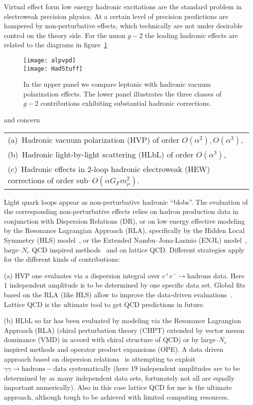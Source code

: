 \documentclass[epj,onecolumn]{webofc}
\newcommand{\mbo}[1]{$#1$ }
\newcommand{\epem}{e^+e^- }
\begin{document}
Virtual effect form low energy hadronic excitations are the standard
problem in electroweak precision physics. At a certain level of
precision predictions are hampered by non-perturbative effects, which
technically are not under desirable control on the theory side. For
the muon $g-2$ the leading hadronic effects are related to the
diagrams in figure~\ref{fig:hadstuff}
\begin{figure}
\centering
\texttt{[image: alpvpd]}\\[-1cm]
\texttt{[image: HadStuff]}
\caption{In the upper panel we compare leptonic with hadronic vacuum
polarization effects. The lower panel illustrates the three classes of
$g-2$ contributions exhibiting substantial hadronic corrections.}
\label{fig:hadstuff}
\end{figure}
and concern
\begin{tabular}{l}
(a)~Hadronic vacuum polarization (HVP) of order $O(\alpha^2),O(\alpha^3)$, \\
(b)~Hadronic light-by-light scattering (HLbL) of order $O(\alpha^3)$, \\
(c)~Hadronic effects in 2-loop hadronic electroweak (HEW) corrections
of order sub--$O(\alpha G_F m_\mu^2)$.
\end{tabular}

\noindent
Light quark loops appear as non-perturbative hadronic ``blobs''. The
evaluation of the corresponding non-perturbative effects relies on
hadron production data in conjunction with Dispersion Relations (DR),
or on low energy effective modeling by the Resonance Lagrangian
Approach (RLA), specifically by the Hidden Local Symmetry (HLS) model~\cite{HKS95},
or the Extended Nambu--Jona-Lasinio (ENJL) model~\cite{BPP1995},
large--$N_c$ QCD inspired methods~\cite{KnechtNyffeler01} and on lattice
QCD. Different strategies apply for the different kinds of
contributions:

(a) HVP one evaluates via a dispersion integral over \mbo{\epem \to
\mathrm{hadrons}} data. Here 1 independent amplitude is to be determined by
one specific data set. Global fits based on the RLA (like HLS) allow
to improve the data-driven evaluations~\cite{Benayoun:2011mm}. Lattice
QCD is the ultimate tool to get QCD predictions in future.

(b) HLbL so far has been evaluated by modeling via the Resonance
Lagrangian Approach (RLA) (chiral perturbation theory (CHPT) extended
by vector meson dominance (VMD) in accord with chiral structure of
QCD) or by large--$N_c$ inspired methods and operator product
expansions (OPE). A data driven approach based on dispersion
relations~\cite{Colangelo:2014pva} is attempting to exploit
\mbo{\gamma\gamma \to
\mathrm{hadrons-data}} systematically (here 19 independent amplitudes
are to be determined by as many independent data sets, fortunately not
all are equally important numerically). Also in this case lattice
QCD for me is the ultimate approach, although tough to be achieved
with limited computing resources.
\end{document}
